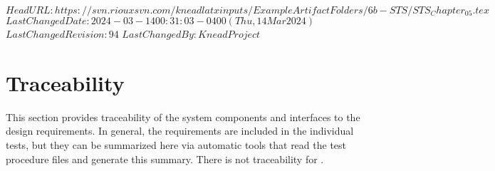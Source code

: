 \svnidlong
{$HeadURL: https://svn.riouxsvn.com/kneadlatxinputs/ExampleArtifactFolders/6b-STS/STS_Chapter_05.tex $}
{$LastChangedDate: 2024-03-14 00:31:03 -0400 (Thu, 14 Mar 2024) $}
{$LastChangedRevision: 94 $}
{$LastChangedBy: KneadProject $}


\chapter{Traceability}
\label{loc:Traceability}
% 

This section provides traceability of the system components and interfaces to the design requirements.
In general, the requirements are included in the individual tests, but they can be summarized here via automatic tools that read the test procedure files and generate this summary.
There is not traceability for \ThisSystem.
